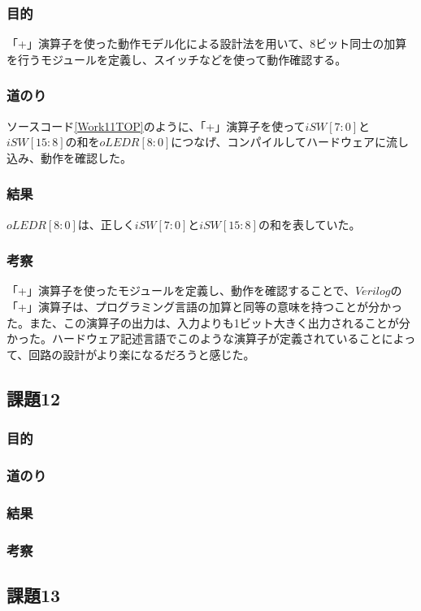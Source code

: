 \documentclass[a4paper]{jarticle}
\begin{document}
\subsubsection{目的}
「+」演算子を使った動作モデル化による設計法を用いて、8ビット同士の加算を行うモジュールを定義し、スイッチなどを使って動作確認する。
\subsubsection{道のり}
ソースコード\ref{Work11TOP}のように、「+」演算子を使って$iSW \left[ 7:0 \right]$と$iSW \left[ 15:8 \right]$の和を$oLEDR \left[ 8:0 \right]$につなげ、コンパイルしてハードウェアに流し込み、動作を確認した。

\subsubsection{結果}
$oLEDR \left[ 8:0 \right]$は、正しく$iSW \left[ 7:0 \right]$と$iSW \left[ 15:8 \right]$の和を表していた。
\subsubsection{考察}
「+」演算子を使ったモジュールを定義し、動作を確認することで、$Verilog$の「+」演算子は、プログラミング言語の加算と同等の意味を持つことが分かった。また、この演算子の出力は、入力よりも1ビット大きく出力されることが分かった。ハードウェア記述言語でこのような演算子が定義されていることによって、回路の設計がより楽になるだろうと感じた。
\subsection{課題12}
\subsubsection{目的}
\subsubsection{道のり}
\subsubsection{結果}
\subsubsection{考察}
\subsection{課題13}
\end{document}
